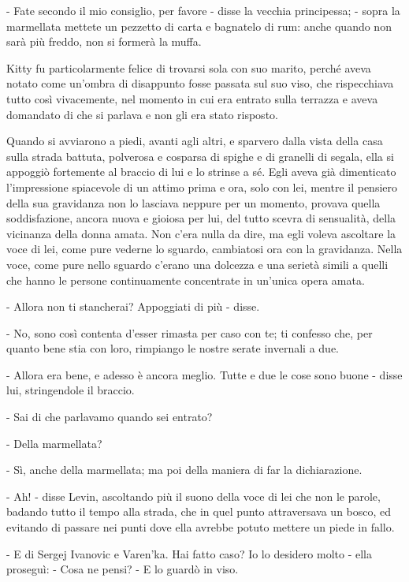 - Fate secondo il mio consiglio, per favore - disse la vecchia principessa; - sopra la marmellata mettete un pezzetto di carta e bagnatelo di rum: anche quando non sarà più freddo, non si formerà la muffa. 

Kitty fu particolarmente felice di trovarsi sola con suo marito, perché aveva notato come un'ombra di disappunto fosse passata sul suo viso, che rispecchiava tutto così vivacemente, nel momento in cui era entrato sulla terrazza e aveva domandato di che si parlava e non gli era stato risposto. 

Quando si avviarono a piedi, avanti agli altri, e sparvero dalla vista della casa sulla strada battuta, polverosa e cosparsa di spighe e di granelli di segala, ella si appoggiò fortemente al braccio di lui e lo strinse a sé. Egli aveva già dimenticato l'impressione spiacevole di un attimo prima e ora, solo con lei, mentre il pensiero della sua gravidanza non lo lasciava neppure per un momento, provava quella soddisfazione, ancora nuova e gioiosa per lui, del tutto scevra di sensualità, della vicinanza della donna amata. Non c'era nulla da dire, ma egli voleva ascoltare la voce di lei, come pure vederne lo sguardo, cambiatosi ora con la gravidanza. Nella voce, come pure nello sguardo c'erano una dolcezza e una serietà simili a quelli che hanno le persone continuamente concentrate in un'unica opera amata. 

- Allora non ti stancherai? Appoggiati di più - disse. 

- No, sono così contenta d'esser rimasta per caso con te; ti confesso che, per quanto bene stia con loro, rimpiango le nostre serate invernali a due. 

- Allora era bene, e adesso è ancora meglio. Tutte e due le cose sono buone - disse lui, stringendole il braccio. 

- Sai di che parlavamo quando sei entrato? 

- Della marmellata? 

- Sì, anche della marmellata; ma poi della maniera di far la dichiarazione. 

- Ah! - disse Levin, ascoltando più il suono della voce di lei che non le parole, badando tutto il tempo alla strada, che in quel punto attraversava un bosco, ed evitando di passare nei punti dove ella avrebbe potuto mettere un piede in fallo. 

- E di Sergej Ivanovic e Varen'ka. Hai fatto caso? Io lo desidero molto - ella proseguì: - Cosa ne pensi? - E lo guardò in viso. 

